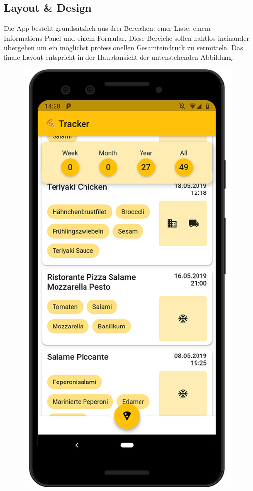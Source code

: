 \subsection{Layout \& Design}

Die App besteht grundsätzlich aus drei Bereichen:
einer Liste, einem Informations-Panel und einem Formular.
Diese Bereiche sollen nahtlos ineinander übergehen um ein
möglichst professionellen Gesamteindruck zu vermitteln.
Das finale Layout entspricht in der Hauptansicht der untenstehenden Abbildung.

\begin{figure}[H]
    \vspace{0pt}
        \includegraphics[width=\linewidth]{pixel-3_mockup-1}

\end{figure}
